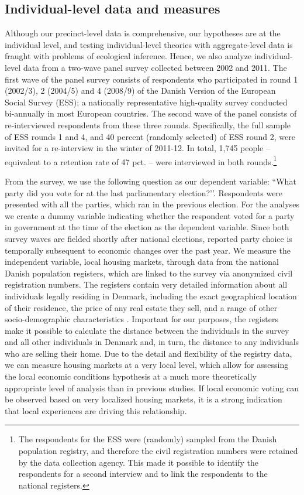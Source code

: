 \documentclass[12pt,a4paper]{article}
\begin{document}
	\subsection{Individual-level data and measures}\label{individuallevel}
	Although our precinct-level data is comprehensive, our hypotheses are at the individual level, and testing individual-level theories with aggregate-level data is fraught with problems of ecological inference. Hence, we also analyze individual-level data from a two-wave panel survey collected between 2002 and 2011. The first wave of the panel survey consists of respondents who participated in round 1 (2002/3), 2 (2004/5) and 4 (2008/9) of the Danish Version of the European Social Survey (ESS); a nationally representative high-quality survey conducted bi-annually in most European countries. The second wave of the panel consists of re-interviewed respondents from these three rounds. Specifically, the full sample of ESS rounds 1 and 4, and 40 percent (randomly selected) of ESS round 2, were invited for a re-interview in the winter of 2011-12. In total, 1,745 people – equivalent to a retention rate of 47 pct. – were interviewed in both rounds.\footnote{The respondents for the ESS were (randomly) sampled from the Danish population registry, and therefore the civil registration numbers were retained by the data collection agency. This made it possible to identify the respondents for a second interview and to link the respondents to the national registers.} 
	
	From the survey, we use the following question as our dependent variable: ``What party did you vote for at the last parliamentary election?’’. Respondents were presented with all the parties, which ran in the previous election. For the analyses we create a dummy variable indicating whether the respondent voted for a party in government at the time of the election as the dependent variable. Since both survey waves are fielded shortly after national elections, reported party choice is temporally subsequent to economic changes over the past year.
	We measure the independent variable, local housing markets, through data from the national Danish population registers, which are linked to the survey via anonymized civil registration numbers. The registers contain very detailed information about all individuals legally residing in Denmark, including the exact geographical location of their residence, the price of any real estate they sell, and a range of other socio-demographic characteristics \citep{thygesen2011introduction}. Important for our purposes, the registers make it possible to calculate the distance between the individuals in the survey and all other individuals in Denmark and, in turn, the distance to any individuals who are selling their home. Due to the detail and flexibility of the registry data, we can measure housing markets at a very local level, which allow for assessing the local economic conditions hypothesis at a much more theoretically appropriate level of analysis than in previous studies. If local economic voting can be observed based on very localized housing markets, it is a strong indication that local experiences are driving this relationship. 
	
\end{document}
